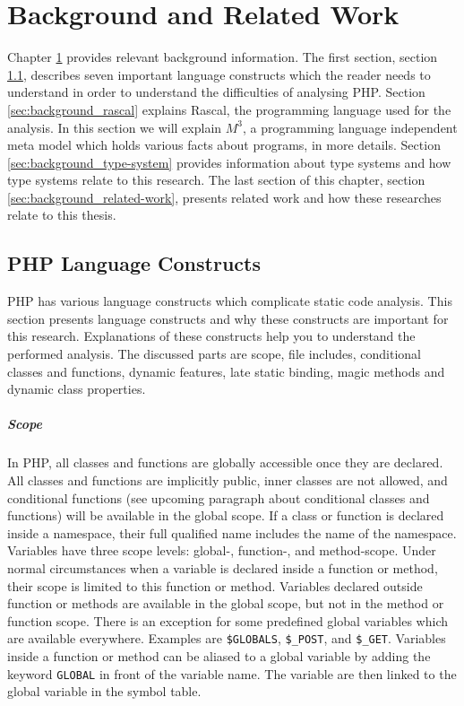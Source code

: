 \documentclass[../main.tex]{subfiles}
\begin{document}
    \chapter{Background and Related Work}\label{ch:background}
    Chapter \ref{ch:background} provides relevant background information.
    The first section, section \ref{sec:background_language-constructs}, describes seven important language constructs which the reader needs to understand in order to understand the difficulties of analysing PHP.
    Section \ref{sec:background_rascal} explains \Gls{Rascal}, the programming language used for the analysis.
    In this section we will explain $M^3$, a programming language independent meta model which holds various facts about programs, in more details.
    Section \ref{sec:background_type-system} provides information about type systems and how type systems relate to this research.
    The last section of this chapter, section \ref{sec:background_related-work}, presents related work and how these researches relate to this thesis.

    \section{PHP Language Constructs}\label{sec:background_language-constructs}
    PHP has various language constructs which complicate \gls{static code analysis}.
    This section presents language constructs and why these constructs are important for this research.
    Explanations of these constructs help you to understand the performed analysis.
    The discussed parts are scope, file includes, conditional classes and functions, dynamic features, late static binding, magic methods and dynamic class properties.
    
    \paragraph{Scope}
    In PHP, all classes and functions are globally accessible once they are declared.
    All classes and functions are implicitly public, inner classes are not allowed, and conditional functions (see upcoming paragraph about conditional classes and functions) will be available in the global scope.
    If a class or function is declared inside a namespace, their full qualified name includes the name of the namespace.
    \\
    Variables have three scope levels: global-, function-, and method-scope.
    Under normal circumstances when a variable is declared inside a function or method, their scope is limited to this function or method.
    Variables declared outside function or methods are available in the global scope, but not in the method or function scope.
    There is an exception for some predefined global variables which are available everywhere. 
    Examples are \texttt{\$GLOBALS}, \texttt{\$\_POST}, and \texttt{\$\_GET}. 
    Variables inside a function or method can be aliased to a global variable by adding the keyword \texttt{GLOBAL} in front of the variable name.
    The variable are then linked to the global variable in the symbol table\footnotemark.
    
\end{document}
